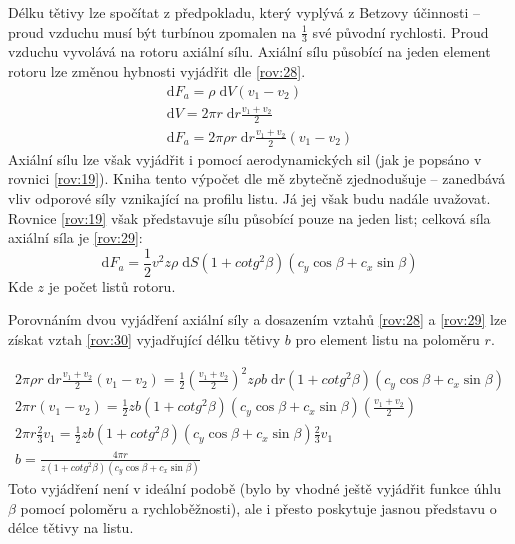 	Délku tětivy lze spočítat z předpokladu, který vyplývá z Betzovy účinnosti – proud vzduchu musí být turbínou zpomalen na $\frac{1}{3}$  své původní rychlosti. Proud vzduchu vyvolává na rotoru axiální sílu. Axiální sílu působící na jeden element rotoru lze změnou hybnosti vyjádřit dle \eqref{rov:28}\cite{Rychetnik:Motory}.
	\begin{eqnarray}
		\label{rov:28}
		\mathrm{d}F_a=\rho\; \mathrm{d}V(v_1 - v_2) \nonumber \\
		\mathrm{d}V=2\pi r \; \mathrm{d}r\frac{v_1+v_2}{2} \nonumber \\
		\mathrm{d}F_a=2\pi\rho r\; \mathrm{d}r\frac{v_1+v_2}{2}(v_1-v_2)
	\end{eqnarray}
	Axiální sílu lze však vyjádřit i pomocí aerodynamických sil (jak je popsáno v rovnici \eqref{rov:19}). Kniha \cite{Rychetnik:Motory} tento výpočet dle mě zbytečně zjednodušuje – zanedbává vliv odporové síly vznikající na profilu listu. Já jej však budu nadále uvažovat. Rovnice \eqref{rov:19} však představuje sílu působící pouze na jeden list; celková síla axiální síla je \eqref{rov:29}:
	\begin{equation}
			\label{rov:29}
			\mathrm{d}F_a=\frac{1}{2}v^2z\rho\;\mathrm{d}S(1+cotg^2 \beta)(c_y \cos \beta + c_x \sin \beta)
	\end{equation}
	Kde $z$ je počet listů rotoru.
	
	Porovnáním dvou vyjádření axiální síly a dosazením vztahů \eqref{rov:28} a \eqref{rov:29} lze získat vztah \eqref{rov:30} vyjadřující délku tětivy $b$ pro element listu na poloměru $r$.
	
	\begin{eqnarray}
		\label{rov:30}
		2\pi\rho r\; \mathrm{d}r\frac{v_1+v_2}{2}(v_1-v_2)=\frac{1}{2}\left( \frac{v_1 + v_2}{2} \right)^{2} z\rho b\;\mathrm{d}r(1+cotg^2 \beta)(c_y \cos \beta + c_x \sin \beta) \nonumber \\
		2\pi r(v_1-v_2)=\frac{1}{2} zb(1+cotg^2 \beta)(c_y \cos \beta + c_x \sin \beta)\left( \frac{v_1 + v_2}{2} \right) \nonumber \\
		2\pi r\frac{2}{3}v_1=\frac{1}{2} zb(1+cotg^2 \beta)(c_y \cos \beta + c_x \sin \beta )\frac{2}{3}v_1 \nonumber \\
		b=\frac{4\pi r}{z(1+cotg^2 \beta)(c_y \cos \beta + c_x \sin \beta )}
	\end{eqnarray}
	Toto vyjádření není v ideální podobě (bylo by vhodné ještě vyjádřit funkce úhlu $\beta$ pomocí poloměru a rychloběžnosti), ale i přesto poskytuje jasnou představu o délce tětivy na listu.
	
